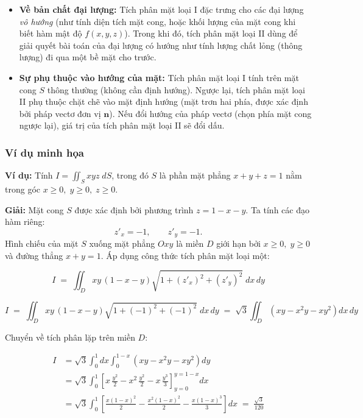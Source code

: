 \begin{itemize}
	\item \textbf{Về bản chất đại lượng:} Tích phân mặt loại I đặc trưng cho các đại lượng \emph{vô hướng} (như tính diện tích mặt cong, hoặc khối lượng của mặt cong khi biết hàm mật độ \( f(x,y,z) \)). Trong khi đó, tích phân mặt loại II dùng để giải quyết bài toán của đại lượng có hướng như tính lượng chất lỏng (thông lượng) đi qua một bề mặt cho trước.
	
	\item \textbf{Sự phụ thuộc vào hướng của mặt:} Tích phân mặt loại I tính trên mặt cong \( S \) thông thường (không cần định hướng). Ngược lại, tích phân mặt loại II phụ thuộc chặt chẽ vào mặt định hướng (mặt trơn hai phía, được xác định bởi pháp vectơ đơn vị \( \mathbf{n} \)). Nếu đổi hướng của pháp vectơ (chọn phía mặt cong ngược lại), giá trị của tích phân mặt loại II sẽ đổi dấu.
\end{itemize} 
\newpage
\subsubsection{Ví dụ minh họa}

\textbf{Ví dụ:}
Tính $I = \iint_{S} xyz\; dS$, trong đó $S$ là phần mặt phẳng $x+y+z=1$
nằm trong góc $x \ge 0,\; y \ge 0,\; z \ge 0$.%

\medskip
\textbf{Giải:}
Mặt cong $S$ được xác định bởi phương trình $z = 1-x-y$.%
Ta tính các đạo hàm riêng:
\[
z'_x = -1, \qquad z'_y = -1.
\]
Hình chiếu của mặt $S$ xuống mặt phẳng $Oxy$ là miền $D$ giới hạn bởi
$x \ge 0,\; y \ge 0$ và đường thẳng $x+y=1$.%
Áp dụng công thức tích phân mặt loại một:%

\begin{equation}
	I \;=\;
	\iint_{D}
	xy\,(1-x-y)
	\sqrt{1 + (z'_x)^2 + (z'_y)^2}\; dx\,dy
\end{equation}

\begin{equation}
	I \;=\;
	\iint_{D}
	xy\,(1-x-y)
	\sqrt{1 + (-1)^2 + (-1)^2}\; dx\,dy
	\;=\;
	\sqrt{3}
	\iint_{D}
	\left(xy - x^2 y - x y^2\right) dx\,dy
\end{equation}

Chuyển về tích phân lặp trên miền $D$:%

\begin{align*}
	I
	&= \sqrt{3}
	\int_{0}^{1} dx
	\int_{0}^{1-x}
	\left(xy - x^2 y - x y^2\right) dy
	\\[6pt] %
	&= \sqrt{3}
	\int_{0}^{1}
	\left[
	x\,\frac{y^2}{2} - x^2\,\frac{y^2}{2} - x\,\frac{y^3}{3}
	\right]_{y=0}^{y=1-x} dx
	\\[6pt] %
	&= \sqrt{3}
	\int_{0}^{1}
	\left[
	\frac{x(1-x)^2}{2}
	- \frac{x^2(1-x)^2}{2}
	- \frac{x(1-x)^3}{3}
	\right] dx
	\;=\;
	\frac{\sqrt{3}}{120}
\end{align*}

